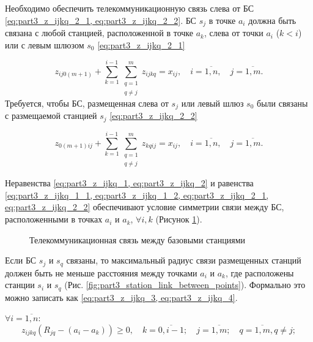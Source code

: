 Необходимо обеспечить телекоммуникационную связь слева от БС \cref{eq:part3_z_ijkq_2_1, eq:part3_z_ijkq_2_2}. БС $ s_j $ в точке $ a_i $ должна быть связана с  любой станцией, расположенной в точке $ a_k $, слева от точки $ a_i $ ($ k <i $) или с левым шлюзом $ s_{0}$ \cref{eq:part3_z_ijkq_2_1} 

\begin{equation}
  \label{eq:part3_z_ijkq_2_1}
  z_{ij0(m+1)} + \sum\limits_{k=1}^{i-1} \sum\limits_{\substack{q = 1\\ q \neq j}}^m z_{ijkq}= x_{ij}, \quad i = \overline{1, n}, \quad j = \overline{1, m}.
\end{equation}
Требуется, чтобы БС, размещенная слева от $s_j$ или левый шлюз $ s_{0} $  были связаны с размещаемой станцией $ s_j $ \cref{eq:part3_z_ijkq_2_2}

\begin{equation}
  \label{eq:part3_z_ijkq_2_2}
    z_{0(m+1)ij} +  \sum\limits_{k=1}^{i-1} \sum\limits_{\substack{q = 1 \\ q \neq j}}^m z_{kqij}= x_{ij},  \quad i = \overline{1, n}, \quad j = \overline{1, m}.
\end{equation}


Неравенства \cref{eq:part3_z_ijkq_1, eq:part3_z_ijkq_2} и равенства \cref{eq:part3_z_ijkq_1_1, eq:part3_z_ijkq_1_2, eq:part3_z_ijkq_2_1, eq:part3_z_ijkq_2_2} обеспечивают условие симметрии связи между БС, расположенными в точках $ a_i $ и $ a_k $, $\forall i, k $ (Рисунок \cref{fig:part3_station_link}).

\begin{figure}[ht]
  \caption{Телекоммуникационная связь между базовыми станциями}\label{fig:part3_station_link}
\end{figure}

Если БС $ s_j $ и $ s_q $ связаны, то максимальный радиус связи размещенных станций должен быть не меньше расстояния между точками $ a_i $ и $ a_k $, где расположены станции $ s_i $ и $ s_q $ (Рис. \cref{fig:part3_station_link_between_points}). Формально это можно записать как \cref{eq:part3_z_ijkq_3, eq:part3_z_ijkq_4}.

 $\forall i= \overline{1,n}$:
\begin{equation}
  \label{eq:part3_z_ijkq_3}
  z_{ijkq}(R_{jq}-(a_i-a_k ))\geq 0, \quad k=\overline{0,i-1}; \quad j=\overline{1,m}; \quad q= \overline{1,m}, q \neq j; 
\end{equation}

